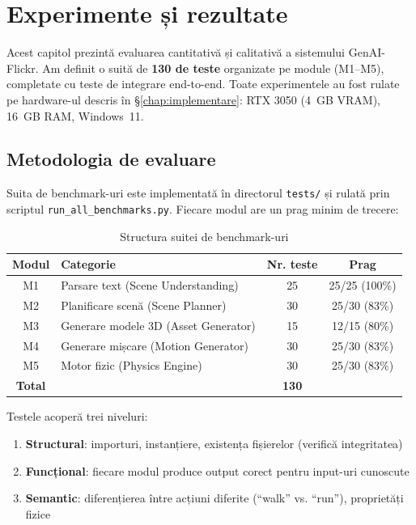 \chapter{Experimente și rezultate}
\label{chap:experimente}

Acest capitol prezintă evaluarea cantitativă și calitativă a sistemului GenAI-Flickr.  Am definit o suită de \textbf{130 de teste} organizate pe module (M1--M5), completate cu teste de integrare end-to-end.  Toate experimentele au fost rulate pe hardware-ul descris în \S\ref{chap:implementare}: RTX 3050 (4~GB VRAM), 16~GB RAM, Windows~11.

\section{Metodologia de evaluare}

Suita de benchmark-uri este implementată în directorul \texttt{tests/} și rulată prin scriptul \texttt{run\_all\_benchmarks.py}.  Fiecare modul are un prag minim de trecere:

\begin{table}[h]
\centering
\begin{tabular}{c l c c}
\hline
\textbf{Modul} & \textbf{Categorie} & \textbf{Nr. teste} & \textbf{Prag} \\
\hline
M1 & Parsare text (Scene Understanding) & 25 & 25/25 (100\%) \\
M2 & Planificare scenă (Scene Planner) & 30 & 25/30 (83\%) \\
M3 & Generare modele 3D (Asset Generator) & 15 & 12/15 (80\%) \\
M4 & Generare mișcare (Motion Generator) & 30 & 25/30 (83\%) \\
M5 & Motor fizic (Physics Engine) & 30 & 25/30 (83\%) \\
\hline
\textbf{Total} & & \textbf{130} & \\
\hline
\end{tabular}
\caption{Structura suitei de benchmark-uri}
\label{tab:benchmark_suite}
\end{table}

Testele acoperă trei niveluri:
\begin{enumerate}
    \item \textbf{Structural}: importuri, instanțiere, existența fișierelor (verifică integritatea)
    \item \textbf{Funcțional}: fiecare modul produce output corect pentru input-uri cunoscute
    \item \textbf{Semantic}: diferențierea între acțiuni diferite (``walk'' vs. ``run''), proprietăți fizice
\end{enumerate}

